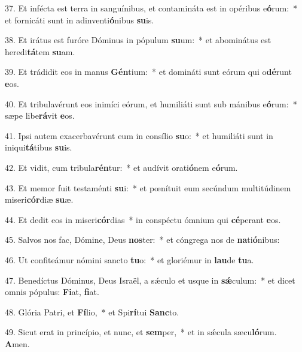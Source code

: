 37. Et infécta est terra in sanguínibus, et contamináta est in opéribus e\textbf{ó}rum:~*  et fornicáti sunt in adinventi\textbf{ó}nibus \textbf{su}is.\

38. Et irátus est furóre Dóminus in pópulum \textbf{su}um:~*  et abominátus est heredi\textbf{tá}tem \textbf{su}am.\

39. Et trádidit eos in manus \textbf{Gén}tium:~*  et domináti sunt eórum qui o\textbf{dé}runt \textbf{e}os.\

40. Et tribulavérunt eos inimíci eórum, et humiliáti sunt sub mánibus e\textbf{ó}rum:~*  sæpe libe\textbf{rá}vit \textbf{e}os.\

41. Ipsi autem exacerbavérunt eum in consílio \textbf{su}o:~*  et humiliáti sunt in iniqui\textbf{tá}tibus \textbf{su}is.\

42. Et vidit, cum tribula\textbf{rén}tur:~*  et audívit orati\textbf{ó}nem e\textbf{ó}rum.\

43. Et memor fuit testaménti \textbf{su}i:~*  et pœnítuit eum secúndum multitúdinem miseri\textbf{cór}diæ \textbf{su}æ.\

44. Et dedit eos in miseri\textbf{cór}dias~*  in conspéctu ómnium qui \textbf{cé}perant \textbf{e}os.\

45. Salvos nos fac, Dómine, Deus \textbf{nos}ter:~*  et cóngrega nos de \textbf{na}ti\textbf{ó}nibus:\

46. Ut confiteámur nómini sancto \textbf{tu}o:~*  et gloriémur in \textbf{lau}de \textbf{tu}a.\

47. Benedíctus Dóminus, Deus Israël, a sǽculo et usque in \textbf{sǽ}culum:~*  et dicet omnis pópulus: \textbf{Fi}at, \textbf{fi}at.\

48. Glória Patri, et \textbf{Fí}lio,~*  et Spi\textbf{rí}tui \textbf{Sanc}to.\

49. Sicut erat in princípio, et nunc, et \textbf{sem}per,~*  et in sǽcula sæcu\textbf{ló}rum. \textbf{A}men.\

